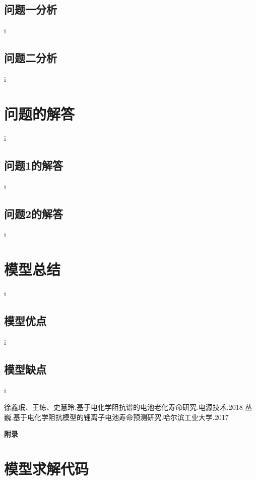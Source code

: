 \documentclass{cumcm}
\begin{document}
\subsection{问题一分析}
i
\subsection{问题二分析}
i
\section{问题的解答}
i
\subsection{问题1的解答}
i
\subsection{问题2的解答}
i
\section{模型总结}
i
\subsection{模型优点}
i
\subsection{模型缺点}
i



\begin{thebibliography}{99}
徐鑫珉、王练、史慧玲.基于电化学阻抗谱的电池老化寿命研究.电源技术.2018
丛巍.基于电化学阻抗模型的锂离子电池寿命预测研究.哈尔滨工业大学.2017
\end{thebibliography}

\newpage
\appendix
\textbf{附录}
\section{模型求解代码}
\end{document}
